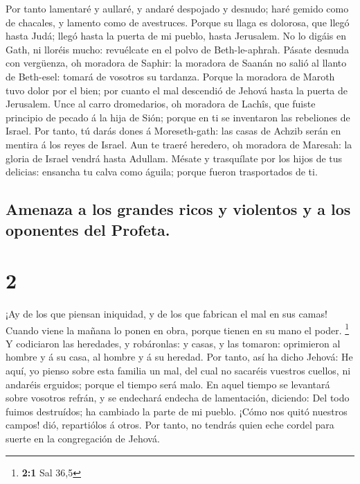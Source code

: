 Por tanto lamentaré y aullaré, y andaré despojado y
desnudo; haré gemido como de chacales, y lamento como de avestruces.
 Porque su llaga es dolorosa, que llegó hasta Judá; llegó
hasta la puerta de mi pueblo, hasta Jerusalem.  No lo
digáis en Gath, ni lloréis mucho: revuélcate en el polvo de
Beth-le-aphrah.  Pásate desnuda con vergüenza, oh
moradora de Saphir: la moradora de Saanán no salió al llanto de
Beth-esel: tomará de vosotros su tardanza.  Porque la
moradora de Maroth tuvo dolor por el bien; por cuanto el mal descendió
de Jehová hasta la puerta de Jerusalem.  Unce al carro
dromedarios, oh moradora de Lachîs, que fuiste principio de pecado á la
hija de Sión; porque en ti se inventaron las rebeliones de Israel.
 Por tanto, tú darás dones á Moreseth-gath: las casas de
Achzib serán en mentira á los reyes de Israel.  Aun te
traeré heredero, oh moradora de Maresah: la gloria de Israel vendrá
hasta Adullam.  Mésate y trasquílate por los hijos de tus
delicias: ensancha tu calva como águila; porque fueron trasportados de
ti.

\hypertarget{amenaza-a-los-grandes-ricos-y-violentos-y-a-los-oponentes-del-profeta.}{%
\subsection{Amenaza a los grandes ricos y violentos y a los oponentes
del
Profeta.}\label{amenaza-a-los-grandes-ricos-y-violentos-y-a-los-oponentes-del-profeta.}}

\hypertarget{section-1}{%
\section{2}\label{section-1}}

 ¡Ay de los que piensan iniquidad, y de los que fabrican
el mal en sus camas! Cuando viene la mañana lo ponen en obra, porque
tienen en su mano el poder. \footnote{\textbf{2:1} Sal 36,5}
 Y codiciaron las heredades, y robáronlas: y casas, y las
tomaron: oprimieron al hombre y á su casa, al hombre y á su heredad.
 Por tanto, así ha dicho Jehová: He aquí, yo pienso sobre
esta familia un mal, del cual no sacaréis vuestros cuellos, ni andaréis
erguidos; porque el tiempo será malo.  En aquel tiempo se
levantará sobre vosotros refrán, y se endechará endecha de lamentación,
diciendo: Del todo fuimos destruídos; ha cambiado la parte de mi pueblo.
¡Cómo nos quitó nuestros campos! dió, repartiólos á otros.
 Por tanto, no tendrás quien eche cordel para suerte en la
congregación de Jehová.

